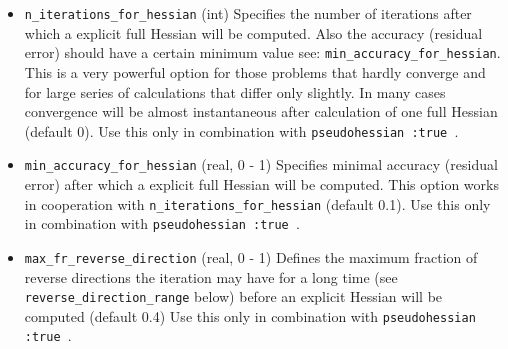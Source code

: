 \documentclass{article}
\begin{document}
\begin{itemize}
\item{\tt n\_iterations\_for\_hessian} (int) Specifies the number of iterations after which a explicit full Hessian will be computed.  Also the accuracy (residual error) should have a certain minimum value see: {\tt min\_accuracy\_for\_hessian}. This is a very powerful option for those problems that hardly converge and for large series of calculations that differ only slightly. In many cases convergence will be almost instantaneous after calculation of one full Hessian (default 0). Use this only in combination with {\tt pseudohessian :true }.

\item{\tt min\_accuracy\_for\_hessian} (real, 0 - 1) Specifies minimal accuracy (residual error) after which a explicit full Hessian will be computed.  This option works in cooperation with {\verb=n_iterations_for_hessian=} (default 0.1). Use this only in combination with {\tt pseudohessian :true }. %

\item{\tt max\_fr\_reverse\_direction} (real, 0 - 1) Defines the maximum fraction of reverse directions the iteration may have for a long time (see {\tt reverse\_direction\_range} below) before an explicit Hessian will be computed (default 0.4)  Use this only in combination with {\tt pseudohessian :true }. %
\end{itemize}
\end{document}
